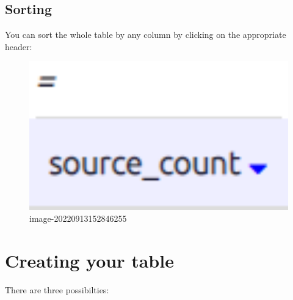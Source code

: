 \documentclass[
]{book}
\begin{document}
\hypertarget{sorting-1}{%
\subsection{Sorting}\label{sorting-1}}

You can sort the whole table by any column by clicking on the appropriate header:

\begin{figure}
\centering
\includegraphics[width=6.77083in,height=\textheight]{_assets/image-20220913152846255.png}
\caption{image-20220913152846255}
\end{figure}

\hypertarget{creating-your-table}{%
\section{Creating your table}\label{creating-your-table}}

There are three possibilties:
\end{document}

